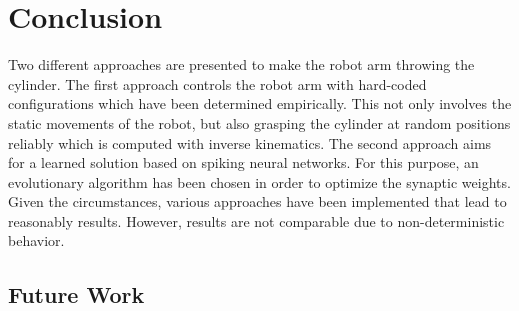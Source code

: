 \section{Conclusion}
\label{sec:conclusion}
\todo{}
Two different approaches are presented to make the robot arm throwing the cylinder.
The first approach controls the robot arm with hard-coded configurations which have been determined empirically.
This not only involves the static movements of the robot, but also grasping the cylinder at random positions reliably which is computed with inverse kinematics.
The second approach aims for a learned solution based on spiking neural networks.
For this purpose, an evolutionary algorithm has been chosen in order to optimize the synaptic weights.
Given the circumstances, various approaches have been implemented that lead to reasonably results.
However, results are not comparable due to non-deterministic behavior.

\subsection{Future Work} %
\label{sub:future_work}
\todo{}

